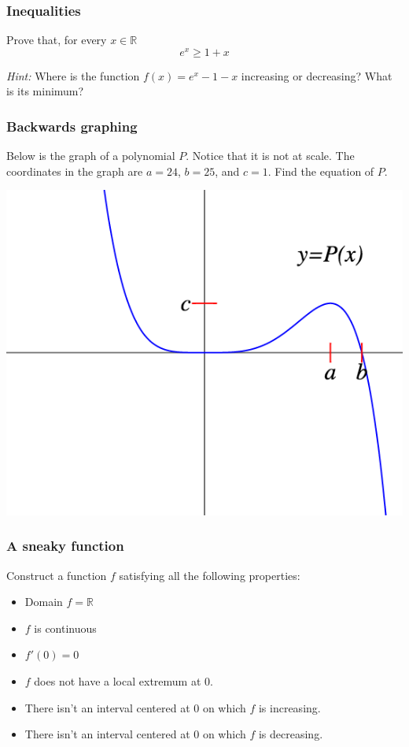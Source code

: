 \documentclass[14pt]{beamer}
\begin{document}
\begin{frame}[t]
	\frametitle{Inequalities}

	Prove that, for every $x \in \mathbb{R}$
	\[
		e^{x}\geq 1 + x
	\]

	\emph{Hint:} Where is the function $\displaystyle f(x) =e^{x}- 1-x$ increasing
	or decreasing? What is its minimum?
\end{frame}

\begin{frame}[t]
	\frametitle{Backwards graphing}

	Below is the graph of a polynomial $P$. Notice that it is not at scale. The
	coordinates in the graph are $a=24$, $b=25$, and $c=1$. Find the equation of $P$.

	\begin{center}
		\includegraphics[scale=.38]{G18}
	\end{center}
\end{frame}

\begin{frame}[t]
	\frametitle{A sneaky function}

	Construct a function $f$ satisfying all the following properties:

	\begin{itemize}
		\item Domain $\displaystyle f = \mathbb{R}$

		\item $f$ is continuous

		\item $f'(0)=0$

		\item $f$ does not have a local extremum at $0$.

		\item There isn't an interval centered at $0$ on which $f$ is increasing.

		\item There isn't an interval centered at $0$ on which $f$ is decreasing.
	\end{itemize}
\end{frame}
\end{document}
